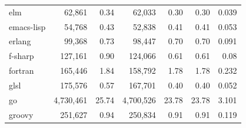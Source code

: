 \documentclass[10pt]{article} %
\begin{document}
\begin{table}[t]
{\begin{tabular}{@{\extracolsep{3pt}}lrrrrrr@{}}
elm                      & 62,861                                    & 0.34                                   & 62,033                                                 & 0.30                                                & 0.30                       & 0.039                          \\
emacs-lisp               & 54,768                                    & 0.43                                   & 52,838                                                 & 0.41                                                & 0.41                       & 0.053                          \\
erlang                   & 99,368                                    & 0.73                                   & 98,447                                                 & 0.70                                                & 0.70                       & 0.091                          \\
f-sharp                  & 127,161                                   & 0.90                                   & 124,066                                                & 0.61                                                & 0.61                       & 0.08                           \\
fortran                  & 165,446                                   & 1.84                                   & 158,792                                                & 1.78                                                & 1.78                       & 0.232                          \\
glsl                     & 175,576                                   & 0.57                                   & 167,701                                                & 0.40                                                & 0.40                       & 0.052                          \\
go                       & 4,730,461                                 & 25.74                                  & 4,700,526                                              & 23.78                                               & 23.78                      & 3.101                          \\
groovy                   & 251,627                                   & 0.94                                   & 250,834                                                & 0.91                                                & 0.91                       & 0.119                          \\

\end{tabular}}
\end{table}
\end{document}
